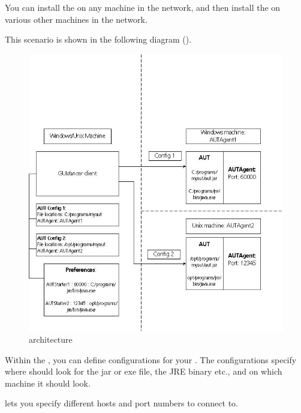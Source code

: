 You can install the \ite{}  on any machine in the network, and then install the \gdagent on various other machines in the network. 

This scenario is shown in the following diagram (). 

\begin{figure}
\begin{center}
\includegraphics{Concepts/Architecture/PS/diffmachines}
\caption{\app{} architecture}
\label{diffmachines}
\end{center}
\end{figure}

Within the \ite{}, you can define configurations for your \gdaut{}. The configurations specify where \app{} should look for the \gdaut{} jar or exe file, the JRE binary etc., and on which machine it should look.

\app{} lets you specify different \gdagent{} hosts and port numbers to connect to. 

